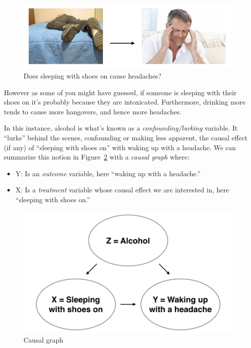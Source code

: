 \documentclass[
  letterpaper,
  DIV=11,
  numbers=noendperiod]{scrreprt}
\providecommand{\tightlist}{%
  \setlength{\itemsep}{0pt}\setlength{\parskip}{0pt}}\usepackage{longtable,booktabs,array}
\theoremstyle{definition}
\theoremstyle{remark}
\begin{document}
\begin{figure}

{\centering \includegraphics{images/flowcharts/flowchart.010-cropped.png}

}

\caption{\label{fig-sleep-shoes-on}Does sleeping with shoes on cause
headaches?}

\end{figure}

However as some of you might have guessed, if someone is sleeping with
their shoes on it's probably because they are intoxicated. Furthermore,
drinking more tends to cause more hangovers, and hence more headaches.

In this instance, alcohol is what's known as a
\emph{confounding/lurking} variable. It ``lurks'' behind the scenes,
confounding or making less apparent, the causal effect (if any) of
``sleeping with shoes on'' with waking up with a headache. We can
summarize this notion in Figure~\ref{fig-moderndive-figure-causal-graph}
with a \emph{causal graph} where:

\begin{itemize}
\tightlist
\item
  Y: Is an \emph{outcome} variable, here ``waking up with a headache.''
\item
  X: Is a \emph{treatment} variable whose causal effect we are
  interested in, here ``sleeping with shoes on.''
\end{itemize}

\begin{figure}

{\centering \includegraphics{images/flowcharts/flowchart.009-cropped.png}

}

\caption{\label{fig-moderndive-figure-causal-graph}Causal graph}

\end{figure}
\end{document}
